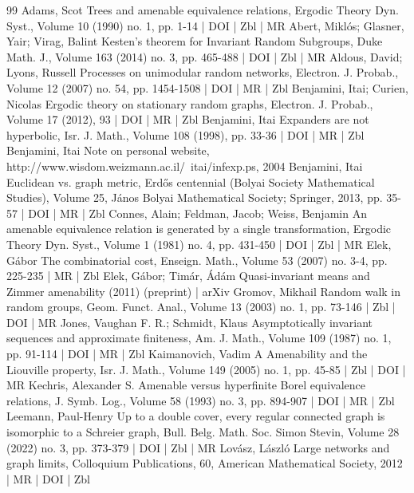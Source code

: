 \documentclass[10pt]{amsart}
\theoremstyle{definition}\newtheorem{defi}[theo]{Definition}\newtheorem{rema}[theo]{Remark}\newtheorem{exam}[theo]{Example}\newtheorem{exem}[theo]{Example}\newtheorem{nota}[theo]{Notation}
\begin{document}
\begin{thebibliography}{99}
 Adams, Scot Trees and amenable equivalence relations, Ergodic Theory Dyn. Syst., Volume 10 (1990) no. 1, pp. 1-14 | DOI | Zbl | MR
 Abert, Miklós; Glasner, Yair; Virag, Balint Kesten’s theorem for Invariant Random Subgroups, Duke Math. J., Volume 163 (2014) no. 3, pp. 465-488 | DOI | Zbl | MR
 Aldous, David; Lyons, Russell Processes on unimodular random networks, Electron. J. Probab., Volume 12 (2007) no. 54, pp. 1454-1508 | DOI | MR | Zbl
 Benjamini, Itai; Curien, Nicolas Ergodic theory on stationary random graphs, Electron. J. Probab., Volume 17 (2012), 93 | DOI | MR | Zbl
 Benjamini, Itai Expanders are not hyperbolic, Isr. J. Math., Volume 108 (1998), pp. 33-36 | DOI | MR | Zbl
 Benjamini, Itai Note on personal website, http://www.wisdom.weizmann.ac.il/~itai/infexp.ps, 2004
 Benjamini, Itai Euclidean vs. graph metric, Erdős centennial (Bolyai Society Mathematical Studies), Volume 25, János Bolyai Mathematical Society; Springer, 2013, pp. 35-57 | DOI | MR | Zbl
 Connes, Alain; Feldman, Jacob; Weiss, Benjamin An amenable equivalence relation is generated by a single transformation, Ergodic Theory Dyn. Syst., Volume 1 (1981) no. 4, pp. 431-450 | DOI | Zbl | MR
 Elek, Gábor The combinatorial cost, Enseign. Math., Volume 53 (2007) no. 3-4, pp. 225-235 | MR | Zbl
 Elek, Gábor; Timár, Ádám Quasi-invariant means and Zimmer amenability (2011) (preprint) | arXiv
 Gromov, Mikhail Random walk in random groups, Geom. Funct. Anal., Volume 13 (2003) no. 1, pp. 73-146 | Zbl | DOI | MR
 Jones, Vaughan F. R.; Schmidt, Klaus Asymptotically invariant sequences and approximate finiteness, Am. J. Math., Volume 109 (1987) no. 1, pp. 91-114 | DOI | MR | Zbl
 Kaimanovich, Vadim A Amenability and the Liouville property, Isr. J. Math., Volume 149 (2005) no. 1, pp. 45-85 | Zbl | DOI | MR
 Kechris, Alexander S. Amenable versus hyperfinite Borel equivalence relations, J. Symb. Log., Volume 58 (1993) no. 3, pp. 894-907 | DOI | MR | Zbl
 Leemann, Paul-Henry Up to a double cover, every regular connected graph is isomorphic to a Schreier graph, Bull. Belg. Math. Soc. Simon Stevin, Volume 28 (2022) no. 3, pp. 373-379 | DOI | Zbl | MR
 Lovász, László Large networks and graph limits, Colloquium Publications, 60, American Mathematical Society, 2012 | MR | DOI | Zbl

\end{thebibliography}
\end{document}
